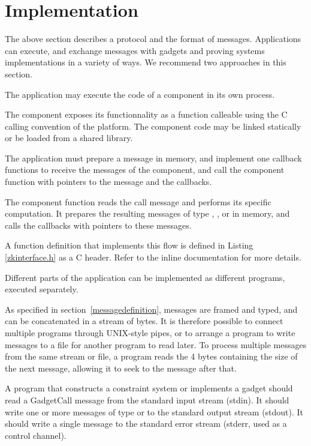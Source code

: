 \section{Implementation}
\label{sec:implementation}

The above section describes a protocol and the format of messages.
Applications can execute, and exchange messages with
gadgets and proving systems implementations in a variety of ways.
We recommend two approaches in this section.

\label{inmemory}
The application may execute the code of a component in its own process.

The component exposes its functionnality as a function calleable using the C calling convention of the platform. The component code may be linked statically or be loaded from a shared library.

The application must prepare a  message in memory, and implement one callback functions to receive the messages of the component,
and call the component function with pointers to the message and the callbacks.

The component function reads the call message and performs its specific computation. It prepares the resulting messages of type
, , or 
in memory, and calls the callbacks with pointers to these messages.

A function definition that implements this flow is defined in Listing \ref{zkinterface.h} as a C header. Refer to the inline documentation for more details.



Different parts of the application can be implemented as different
programs, executed separately.

As specified in section~\ref{messagedefinition}, messages are framed and typed,
and can be concatenated in a stream of bytes. It is therefore possible to connect multiple programs through UNIX-style pipes, or to arrange a program to write messages to a file for another program to read later.
To process multiple messages from the same stream or file, a program
reads the 4 bytes containing the size of the next message, allowing it to seek
to the message after that.

A program that constructs a constraint system or implements a gadget should read a GadgetCall message from the standard input stream (stdin).
It should write one or more messages of type
 or 
to the standard output stream (stdout).
It should write a single  message to the standard error stream
(stderr, used as a control channel).

